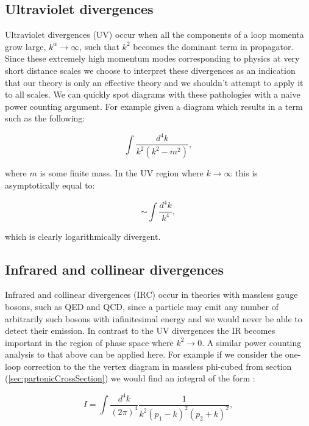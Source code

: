 	\subsection{Ultraviolet divergences}

		Ultraviolet divergences (UV) occur when all the components of a loop momenta grow large,
		$k^\alpha\rightarrow\infty$, such that $k^2$ becomes the dominant term in propagator.
		Since these extremely high momentum modes corresponding to physics at very short distance scales
		we choose to interpret these divergences as an indication that our theory is only an effective
		theory and we shouldn't attempt to apply it to all scales.  We can quickly spot diagrams with these
		pathologies with a naive power counting argument.  For example given a diagram which results in a
		term such as the following:

		\begin{equation}
			\int \frac{d^4k}{k^2(k^2-m^2)},
		\end{equation}

		where $m$ is some finite mass. In the UV region where $k\rightarrow\infty$ this is asymptotically equal
		to:

		\begin{equation}
			\sim\int\frac{d^4k}{k^4},
		\end{equation}

		which is clearly logarithmically divergent.

	\subsection{Infrared and collinear divergences}

		Infrared and collinear divergences (IRC) occur in theories with massless gauge bosons, such as
		QED and QCD, since a particle may emit any number of arbitrarily such bosons with infinitesimal
		energy and we would never be able to detect their emission.  In contrast to the UV divergences
		the IR becomes important in the region of phase space where $k^2\rightarrow0$.  A similar power
		counting analysis to that above can be applied here.  For example if we consider the one-loop
		correction to the the vertex diagram in massless phi-cubed from section (\ref{sec:partonicCrossSection})
		we would find an integral of the form \cite{Sterman:1995fz}:

		\begin{equation}
			I = \int\frac{d^4k}{(2\pi)^4}\frac{1}{k^2(p_1-k)^2(p_2+k)^2},
		\end{equation}

